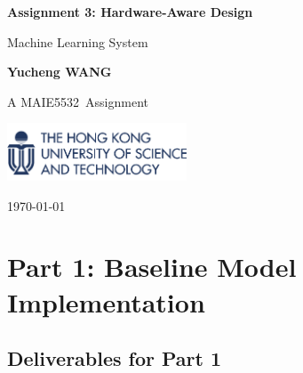 \documentclass[10pt, a4paper]{article}
\newcommand\course{MAIE5532}                            %
\newcommand\Information{Yucheng WANG}                        %
\begin{document}
\begin{titlepage}
    \begin{center}
        \vspace*{3cm}
            
        \Huge
        \textbf{Assignment 3: Hardware-Aware Design}
            
        \vspace{1cm}
        \huge
        Machine Learning System
            
        \vspace{1.5cm}
        \Large
            
        \textbf{\Information}                      %
        
            
        \vfill
        
        A \course \ Assignment
            
        \vspace{1cm}
            
        \includegraphics[width=0.4\textwidth]{logo-hkust.png}
        \\
        
        \Large
        
        \today
            
    \end{center}
\end{titlepage}


\newpage
\setcounter{tocdepth}{1}
\setcounter{secnumdepth}{0}
\tableofcontents

\newpage
\section*{Part 1: Baseline Model Implementation}

\subsection{Deliverables for Part 1}
\end{document}
